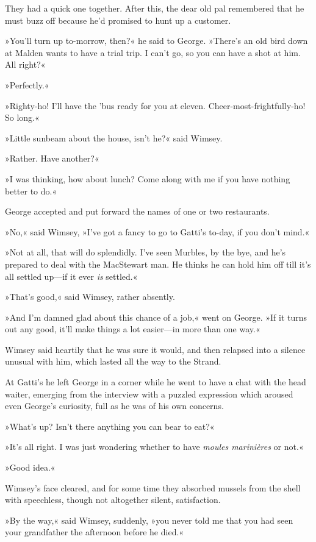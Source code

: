 They had a quick one together. After this, the dear old pal remembered that he must buzz off because he'd promised to hunt up a customer.

»You'll turn up to-morrow, then?« he said to George. »There's an old bird down at Malden wants to have a trial trip. I can't go, so you can have a shot at him. All right?«

»Perfectly.«

»Righty-ho! I'll have the 'bus ready for you at eleven. Cheer-most-frightfully-ho! So long.«

»Little sunbeam about the house, isn't he?« said Wimsey.

»Rather. Have another?«

»I was thinking, how about lunch? Come along with me if you have nothing better to do.«

George accepted and put forward the names of one or two restaurants.

»No,« said Wimsey, »I've got a fancy to go to Gatti's to-day, if you don't mind.«

»Not at all, that will do splendidly. I've seen Murbles, by the bye, and he's prepared to deal with the MacStewart man. He thinks he can hold him off till it's all settled up—if it ever \textit{is} settled.«

»That's good,« said Wimsey, rather absently.

»And I'm damned glad about this chance of a job,« went on George. »If it turns out any good, it'll make things a lot easier—in more than one way.«

Wimsey said heartily that he was sure it would, and then relapsed into a silence unusual with him, which lasted all the way to the Strand.

At Gatti's he left George in a corner while he went to have a chat with the head waiter, emerging from the interview with a puzzled expression which aroused even George's curiosity, full as he was of his own concerns.

»What's up? Isn't there anything you can bear to eat?«

»It's all right. I was just wondering whether to have \textit{moules marinières} or not.«

»Good idea.«

Wimsey's face cleared, and for some time they absorbed mussels from the shell with speechless, though not altogether silent, satisfaction.

»By the way,« said Wimsey, suddenly, »you never told me that you had seen your grandfather the afternoon before he died.«

